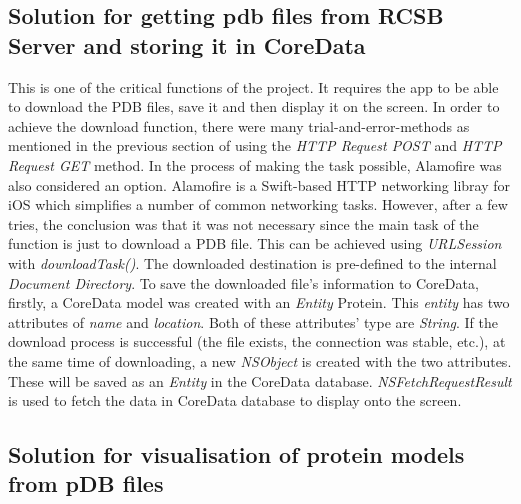 \begin{itemize}
\end{itemize}

\subsection{Solution for getting pdb files from RCSB Server and storing it in CoreData}
This is one of the critical functions of the project. It requires the app to be able to download the PDB files, save it and then display it on the screen. 
In order to achieve the download function, there were many trial-and-error-methods as mentioned in the previous section of using the \emph{HTTP Request POST} and \emph{HTTP Request GET} method. In the process of making the task possible, Alamofire was also considered an option. Alamofire is a Swift-based HTTP networking libray for iOS which simplifies a number of common networking tasks. However, after a few tries, the conclusion was that it was not necessary since the main task of the function is just to download a PDB file. This can be achieved using \emph{URLSession} with \emph{downloadTask()}. The downloaded destination is pre-defined to the internal \emph{Document Directory}. 
To save the downloaded file’s information to CoreData, firstly, a CoreData model was created with an \emph{Entity} Protein. This \emph{entity} has two attributes of \emph{name} and \emph{location}. Both of these attributes’ type are \emph{String}. If the download process is successful (the file exists, the connection was stable, etc.), at the same time of downloading, a new \emph{NSObject} is created with the two attributes. These will be saved as an \emph{Entity} in the CoreData database. 
\emph{NSFetchRequestResult} is used to fetch the data in CoreData database to display onto the screen.   



\subsection{Solution for visualisation of protein models from pDB files}


